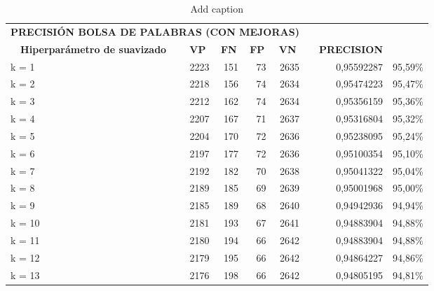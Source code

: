 \documentclass{article}
\begin{document}
\begin{table}[htbp]
  \centering
  \caption{Add caption}
    \begin{tabular}{rrrrrrlr}
    \multicolumn{5}{c}{\textbf{PRECISIÓN BOLSA DE PALABRAS (CON MEJORAS)}} &       &       &  \\
    \multicolumn{1}{c}{\textbf{Hiperparámetro de suavizado}} & \multicolumn{1}{c}{\textbf{VP}} & \multicolumn{1}{c}{\textbf{FN}} & \multicolumn{1}{c}{\textbf{FP}} & \multicolumn{1}{c}{\textbf{VN}} &       & \textbf{PRECISION} &  \\
    \multicolumn{1}{l}{k = 1} & 2223  & 151   & 73    & 2635  &       & \multicolumn{1}{r}{0,95592287} & 95,59\% \\
    \multicolumn{1}{l}{k = 2} & 2218  & 156   & 74    & 2634  &       & \multicolumn{1}{r}{0,95474223} & 95,47\% \\
    \multicolumn{1}{l}{k = 3} & 2212  & 162   & 74    & 2634  &       & \multicolumn{1}{r}{0,95356159} & 95,36\% \\
    \multicolumn{1}{l}{k = 4} & 2207  & 167   & 71    & 2637  &       & \multicolumn{1}{r}{0,95316804} & 95,32\% \\
    \multicolumn{1}{l}{k = 5} & 2204  & 170   & 72    & 2636  &       & \multicolumn{1}{r}{0,95238095} & 95,24\% \\
    \multicolumn{1}{l}{k = 6} & 2197  & 177   & 72    & 2636  &       & \multicolumn{1}{r}{0,95100354} & 95,10\% \\
    \multicolumn{1}{l}{k = 7} & 2192  & 182   & 70    & 2638  &       & \multicolumn{1}{r}{0,95041322} & 95,04\% \\
    \multicolumn{1}{l}{k = 8} & 2189  & 185   & 69    & 2639  &       & \multicolumn{1}{r}{0,95001968} & 95,00\% \\
    \multicolumn{1}{l}{k = 9} & 2185  & 189   & 68    & 2640  &       & \multicolumn{1}{r}{0,94942936} & 94,94\% \\
    \multicolumn{1}{l}{k = 10} & 2181  & 193   & 67    & 2641  &       & \multicolumn{1}{r}{0,94883904} & 94,88\% \\
    \multicolumn{1}{l}{k = 11} & 2180  & 194   & 66    & 2642  &       & \multicolumn{1}{r}{0,94883904} & 94,88\% \\
    \multicolumn{1}{l}{k = 12} & 2179  & 195   & 66    & 2642  &       & \multicolumn{1}{r}{0,94864227} & 94,86\% \\
    \multicolumn{1}{l}{k = 13} & 2176  & 198   & 66    & 2642  &       & \multicolumn{1}{r}{0,94805195} & 94,81\% \\

\end{tabular}
\end{table}
\end{document}
